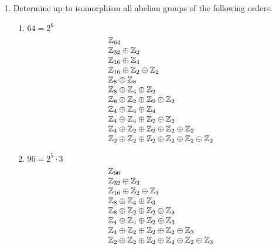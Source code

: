 \documentclass[letterpaper,12pt,fleqn]{article}
\begin{document}
\begin{enumerate}[label={\alph*)}]
\item Determine up to isomorphism all abelian groups of the following orders:
  \begin{enumerate}[label={\roman*)}]
  \item $64=2^6$
    \[\begin{array}{l}
    \mathbb{Z}_{64} \\
    \mathbb{Z}_{32}\oplus\mathbb{Z}_2 \\
    \mathbb{Z}_{16}\oplus\mathbb{Z}_{4} \\
    \mathbb{Z}_{16}\oplus\mathbb{Z}_{2}\oplus\mathbb{Z}_{2} \\
    \mathbb{Z}_8\oplus\mathbb{Z}_8 \\
    \mathbb{Z}_8\oplus\mathbb{Z}_4\oplus\mathbb{Z}_2 \\
    \mathbb{Z}_8\oplus\mathbb{Z}_2\oplus\mathbb{Z}_2\oplus\mathbb{Z}_2 \\
    \mathbb{Z}_4\oplus\mathbb{Z}_4\oplus\mathbb{Z}_4 \\
    \mathbb{Z}_4\oplus\mathbb{Z}_4\oplus\mathbb{Z}_2\oplus\mathbb{Z}_2 \\
    \mathbb{Z}_4\oplus\mathbb{Z}_2\oplus\mathbb{Z}_2\oplus\mathbb{Z}_2\oplus\mathbb{Z}_2 \\
    \mathbb{Z}_2\oplus\mathbb{Z}_2\oplus\mathbb{Z}_2\oplus\mathbb{Z}_2\oplus\mathbb{Z}_2\oplus\mathbb{Z}_2 \\
    \end{array}\]

  \item $96=2^5\cdot3$
    \[\begin{array}{l}
    \mathbb{Z}_{96} \\
    \mathbb{Z}_{32}\oplus\mathbb{Z}_3 \\
    \mathbb{Z}_{16}\oplus\mathbb{Z}_2\oplus\mathbb{Z}_3 \\
    \mathbb{Z}_8\oplus\mathbb{Z}_4\oplus\mathbb{Z}_3 \\
    \mathbb{Z}_8\oplus\mathbb{Z}_2\oplus\mathbb{Z}_2\oplus\mathbb{Z}_3 \\
    \mathbb{Z}_4\oplus\mathbb{Z}_4\oplus\mathbb{Z}_2\oplus\mathbb{Z}_3 \\
    \mathbb{Z}_4\oplus\mathbb{Z}_2\oplus\mathbb{Z}_2\oplus\mathbb{Z}_2\oplus\mathbb{Z}_3 \\
    \mathbb{Z}_2\oplus\mathbb{Z}_2\oplus\mathbb{Z}_2\oplus\mathbb{Z}_2\oplus\mathbb{Z}_2\oplus\mathbb{Z}_3 \\
    \end{array}\]
  \end{enumerate}


\end{enumerate}
\end{document}
